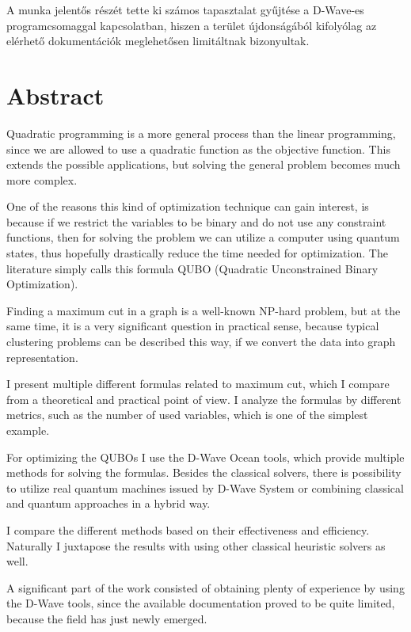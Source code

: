 A munka jelentős részét tette ki számos tapasztalat gyűjtése a D-Wave-es programcsomaggal kapcsolatban, hiszen a terület újdonságából kifolyólag az elérhető dokumentációk meglehetősen limitáltnak bizonyultak.

\vfill
\selectenglish



\chapter*{Abstract}

Quadratic programming is a more general process than the linear programming, since we are allowed to use a quadratic function as the objective function. This extends the possible applications, but solving the general problem becomes much more complex.

One of the reasons this kind of optimization technique can gain interest, is because if we restrict the variables to be binary and do not use any constraint functions, then for solving the problem we can utilize a computer using quantum states, thus hopefully drastically reduce the time needed for optimization. The literature simply calls this formula QUBO (Quadratic Unconstrained Binary Optimization).

Finding a maximum cut in a graph is a well-known NP-hard problem, but at the same time, it is a very significant question in practical sense, because typical clustering problems can be described this way, if we convert the data into graph representation.

I present multiple different formulas related to maximum cut, which I compare from a theoretical and practical point of view. I analyze the formulas by different metrics, such as the number of used variables, which is one of the simplest example.

For optimizing the QUBOs I use the D-Wave Ocean tools, which provide multiple methods for solving the formulas. Besides the classical solvers, there is possibility to utilize real quantum machines issued by D-Wave System or combining classical and quantum approaches in a hybrid way. 

I compare the different methods based on their effectiveness and efficiency. Naturally I juxtapose the results with using other classical heuristic solvers as well.

A significant part of the work consisted of obtaining plenty of experience by using the D-Wave tools, since the available documentation proved to be quite limited, because the field has just newly emerged.


\vfill
\selectthesislanguage

\setcounter{romanPage}{\value{page}}
